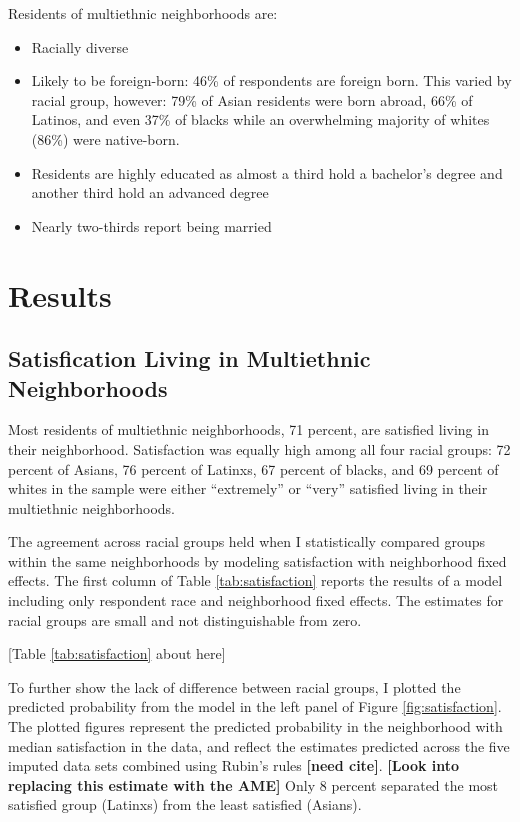 \documentclass[]{article}
\providecommand{\tightlist}{%
  \setlength{\itemsep}{0pt}\setlength{\parskip}{0pt}}
\theoremstyle{definition}
\theoremstyle{definition}
\theoremstyle{definition}
\theoremstyle{remark}
\begin{document}
Residents of multiethnic neighborhoods are:

\begin{itemize}
\tightlist
\item
  Racially diverse
\item
  Likely to be foreign-born: 46\% of respondents are foreign born. This
  varied by racial group, however: 79\% of Asian residents were born
  abroad, 66\% of Latinos, and even 37\% of blacks while an overwhelming
  majority of whites (86\%) were native-born.
\item
  Residents are highly educated as almost a third hold a bachelor's
  degree and another third hold an advanced degree
\item
  Nearly two-thirds report being married
\end{itemize}

\doublespacing
\section{Results}\label{results}

\subsection{Satisfication Living in Multiethnic
Neighborhoods}\label{satisfication-living-in-multiethnic-neighborhoods}

Most residents of multiethnic neighborhoods, 71 percent, are satisfied
living in their neighborhood. Satisfaction was equally high among all
four racial groups: 72 percent of Asians, 76 percent of Latinxs, 67
percent of blacks, and 69 percent of whites in the sample were either
``extremely'' or ``very'' satisfied living in their multiethnic
neighborhoods.

The agreement across racial groups held when I statistically compared
groups within the same neighborhoods by modeling satisfaction with
neighborhood fixed effects. The first column of Table
\ref{tab:satisfaction} reports the results of a model including only
respondent race and neighborhood fixed effects. The estimates for racial
groups are small and not distinguishable from zero.

{[}Table \ref{tab:satisfaction} about here{]}

To further show the lack of difference between racial groups, I plotted
the predicted probability from the model in the left panel of Figure
\ref{fig:satisfaction}. The plotted figures represent the predicted
probability in the neighborhood with median satisfaction in the data,
and reflect the estimates predicted across the five imputed data sets
combined using Rubin's rules \textbf{{[}need cite{]}}. \textbf{{[}Look
into replacing this estimate with the AME{]}} Only 8 percent separated
the most satisfied group (Latinxs) from the least satisfied (Asians).
\end{document}
